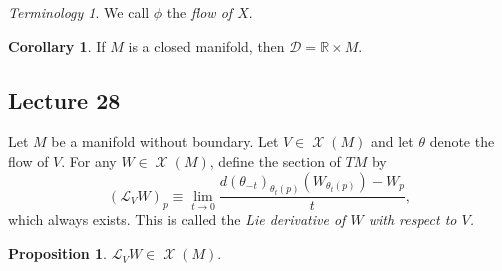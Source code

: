 \documentclass[10pt,letterpaper,cm]{nupset}
\theoremstyle{definition}
\theoremstyle{theorem}
\newtheorem{prop}[definition]{Proposition}
\newtheorem{corollary}[definition]{Corollary}
\theoremstyle{remark}
\newtheorem*{term}{Terminology}
\newcommand{\R}{\mathbb R}
\newcommand{\1}{\mathbf{1}}
\newcommand{\0}{\vec 0}
\DeclareMathOperator{\vf}{\mathscr{X}}
\begin{document}
\begin{term}
We call $\phi$ the \textit{flow of $X$}.
\end{term}

\begin{corollary}
If $M$ is a closed manifold, then $\mathcal{D} = \R \times M$.
\end{corollary}

\subsection{Lecture 28}


Let $M$ be a manifold without boundary. Let $V\in \vf(M)$ and let $\theta$ denote the flow of $V$. For any $W\in \vf(M)$, define the section of $T{M}$ by $$ \left(\mathcal{L}_VW\right)_p  \equiv \lim_{t\to 0}\frac{d(\theta_{-t})_{\theta_t(p)}\left(W_{\theta_{t}(p)}\right)-W_p }{t},$$ which always exists.  This is called the \textit{Lie derivative of $W$ with respect to $V$.}


\begin{prop}
$\mathcal{L}_VW \in \vf(M)$.
\end{prop}
\end{document}
